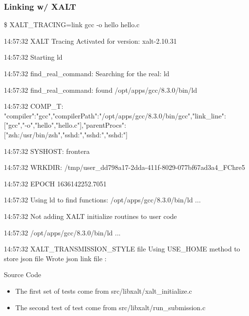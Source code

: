 \documentclass{beamer}
\begin{document}
\begin{frame}[fragile]
    \frametitle{Linking w/ XALT}
 {\tiny
    \begin{semiverbatim}
\$ XALT_TRACING=link gcc -o hello hello.c

14:57:32 XALT Tracing Activated for version: xalt-2.10.31

14:57:32 Starting ld

14:57:32 find_real_command: Searching for the real: ld

14:57:32 find_real_command: found /opt/apps/gcc/8.3.0/bin/ld

14:57:32 COMP_T: {"compiler":"gcc","compilerPath":"/opt/apps/gcc/8.3.0/bin/gcc","link_line":["gcc","-o","hello","hello.c"],"parentProcs":["zsh:/usr/bin/zsh","sshd:","sshd:","sshd:"]}

14:57:32 SYSHOST: frontera

14:57:32 WRKDIR: /tmp/user_dd798a17-2dda-411f-8029-077bf67ad3a4_FChre5

14:57:32 EPOCH 1636142252.7051

14:57:32 Using ld to find functions:  /opt/apps/gcc/8.3.0/bin/ld ...

14:57:32 Not adding XALT initialize routines to user code

14:57:32 /opt/apps/gcc/8.3.0/bin/ld ...

14:57:32 XALT_TRANSMISSION_STYLE file
    Using USE_HOME method to store json file
    Wrote json link file : 
   \end{semiverbatim}
}
\end{frame}

\begin{frame}{Source Code} 
  \begin{itemize}
    \item The first set of tests come from
      src/libxalt/xalt\_initialize.c
    \item The second test of test come from src/libxalt/run\_submission.c
  \end{itemize}
\end{frame}
\end{document}

